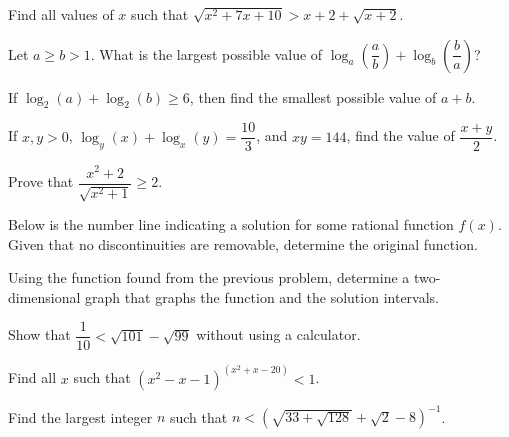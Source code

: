 \documentclass[lang=en,11pt]{elegantbook}
\begin{document}
\begin{challengeset}
\item Find all values of $x$ such that $\sqrt{x^2+7x+10}>x+2+\sqrt{x+2}$. \vspace{3mm}
\item Let $a\geq b>1$. What is the largest possible value of $\log_a{\left(\dfrac{a}{b}\right)}+\log_b{\left(\dfrac{b}{a}\right)}$? \vspace{3mm}
\item If $\log_2(a)+\log_2(b)\geq 6$, then find the smallest possible value of $a+b$. \vspace{3mm}
\item If $x,y>0$, $\log_y(x)+\log_x(y)=\dfrac{10}{3}$, and $xy=144$, find the value of $\dfrac{x+y}{2}$. \vspace{2mm}
\item Prove that $\dfrac{x^2+2}{\sqrt{x^2+1}}\geq 2$. \vspace{3mm}
\item Below is the number line indicating a solution for some rational function $f(x)$.  Given that no discontinuities are removable, determine the original function.
\begin{figure}[!h]
    \centering
\end{figure} \vspace{3mm}
\item Using the function found from the previous problem, determine a two-dimensional graph that graphs the function and the solution intervals. \vspace{3mm}
\item Show that $\dfrac{1}{10}<\sqrt{101}-\sqrt{99}$ without using a calculator. \vspace{3mm}
\item Find all $x$ such that $\left(x^2-x-1\right)^{\left(x^2+x-20\right)}<1$. \vspace{3mm}
\item Find the largest integer $n$ such that $n<\left(\sqrt{33+\sqrt{128}}+\sqrt{2}-8\right)^{-1}$. \vspace{3mm}
\end{challengeset}
\end{document}
